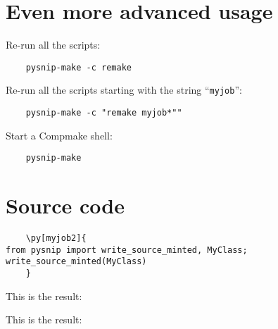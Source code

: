 \documentclass{article}
\begin{document}
  \section{Even more advanced usage}

  Re-run all the scripts:

  \begin{verbatim}
    pysnip-make -c remake
  \end{verbatim}

  Re-run all the scripts starting with the string ``\texttt{myjob}'':

  \begin{verbatim}
    pysnip-make -c "remake myjob*""
  \end{verbatim}

  Start a Compmake shell:

  \begin{verbatim}
    pysnip-make
  \end{verbatim}


  \section{Source code}

  \begin{verbatim}
    \py[myjob2]{
from pysnip import write_source_minted, MyClass;
write_source_minted(MyClass)
    }
  \end{verbatim}

  This is the result:
  \begin{quote}
  \end{quote}

  This is the result:
  \begin{quote}
  \end{quote}
\end{document}
